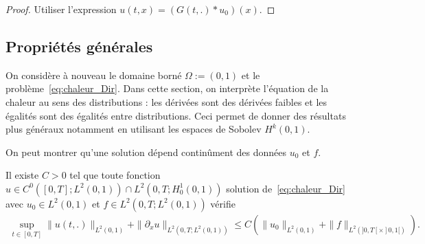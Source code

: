 \documentclass[12pt,a4paper,twoside]{article}
\begin{document}
\begin{proof}
  Utiliser l'expression $u(t,x) = (G(t,.) * u_0)(x)$.
\end{proof}

\subsection{Propri\'et\'es g\'en\'erales}
\label{subsec:chaleur_prop}


On consid\`ere \`a nouveau le domaine born\'e $\Omega := (0,1)$
et le probl\`eme~\eqref{eq:chaleur_Dir}.
Dans cette section, on interpr\`ete l'\'equation de la chaleur au sens des distributions :
les d\'eriv\'ees sont des d\'eriv\'ees faibles et les \'egalit\'es sont des \'egalit\'es
entre distributions.
Ceci permet de donner des r\'esultats plus g\'en\'eraux notamment en utilisant
les espaces de Sobolev $H^k(0,1)$.

On peut montrer qu'une solution d\'epend contin\^ument des donn\'ees $u_0$ et $f$.
\begin{proposition}
  \label{prop:chaleur_continuite_donnees}
  Il existe $C>0$ tel que toute fonction
  $u \in C^0([0,T];L^2(0,1)) \cap L^2(0,T;H_0^1(0,1))$ solution de~\eqref{eq:chaleur_Dir}
  avec $u_0 \in L^2(0,1)$ et $f \in L^2(0,T; L^2(0,1))$
  v\'erifie
  \begin{align}
    \label{eq:chaleur_continuite_donnees}
    \sup_{t \in [0,T]} \| u(t,.) \|_{L^2(0,1)} + \| \partial_x u \|_{L^2(0,T;L^2(0,1))}
    \leq C (\| u_0 \|_{L^2(0,1)} + \| f \|_{L^2(]0,T[ \times ]0,1[)}) .
  \end{align}
\end{proposition}
\end{document}
